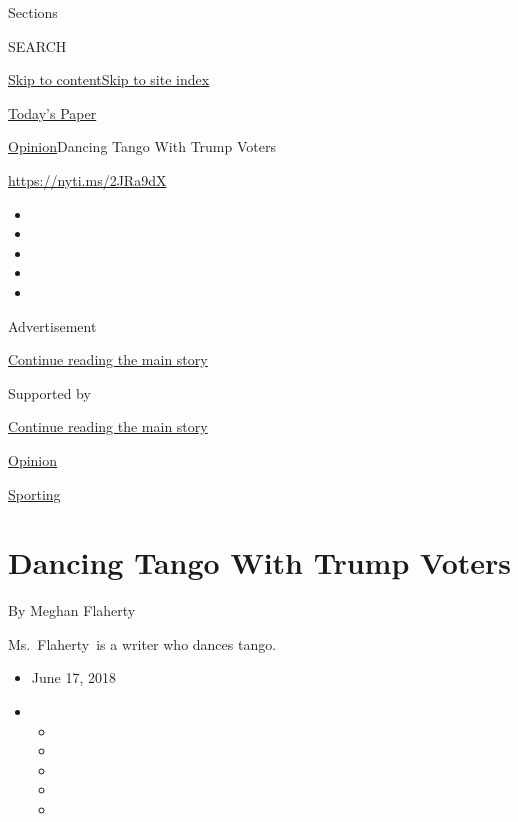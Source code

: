 Sections

SEARCH

\protect\hyperlink{site-content}{Skip to
content}\protect\hyperlink{site-index}{Skip to site index}

\href{https://myaccount.nytimes.com/auth/login?response_type=cookie\&client_id=vi}{}

\href{https://www.nytimes.com/section/todayspaper}{Today's Paper}

\href{/section/opinion}{Opinion}\textbar{}Dancing Tango With Trump
Voters

\href{https://nyti.ms/2JRa9dX}{https://nyti.ms/2JRa9dX}

\begin{itemize}
\item
\item
\item
\item
\item
\end{itemize}

Advertisement

\protect\hyperlink{after-top}{Continue reading the main story}

Supported by

\protect\hyperlink{after-sponsor}{Continue reading the main story}

\href{/section/opinion}{Opinion}

\href{/column/sporting}{Sporting}

\hypertarget{dancing-tango-with-trump-voters}{%
\section{Dancing Tango With Trump
Voters}\label{dancing-tango-with-trump-voters}}

By Meghan Flaherty

Ms.~Flaherty~is a writer who dances tango.

\begin{itemize}
\item
  June 17, 2018
\item
  \begin{itemize}
  \item
  \item
  \item
  \item
  \item
  \end{itemize}
\end{itemize}

